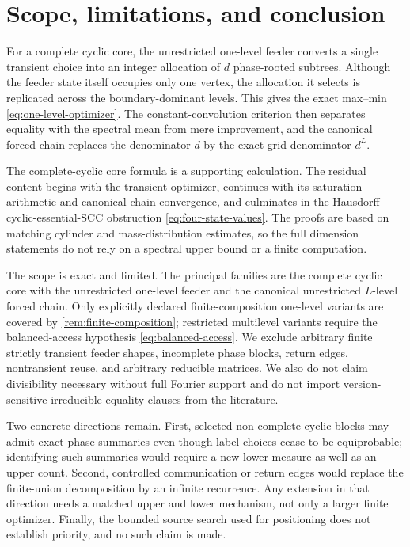 \section{Scope, limitations, and conclusion}
\label{sec:conclusion}

For a complete cyclic core, the unrestricted one-level feeder converts a
single transient choice into an integer allocation of $d$ phase-rooted
subtrees.  Although the feeder state itself occupies only one vertex, the
allocation it selects is replicated across the boundary-dominant levels.
This gives the exact max--min \eqref{eq:one-level-optimizer}.  The
constant-convolution criterion then separates equality with the spectral
mean from mere improvement, and the canonical forced chain replaces the
denominator $d$ by the exact grid denominator $d^L$.

The complete-cyclic core formula is a supporting calculation.  The residual
content begins with the transient optimizer, continues with its saturation
arithmetic and canonical-chain convergence, and culminates in the Hausdorff
cyclic-essential-SCC obstruction \eqref{eq:four-state-values}.  The proofs are based on
matching cylinder and mass-distribution estimates, so the full dimension
statements do not rely on a spectral upper bound or a finite computation.

The scope is exact and limited.  The principal families are the complete
cyclic core with the unrestricted one-level feeder and the canonical
unrestricted $L$-level forced chain.  Only explicitly declared
finite-composition one-level variants are covered by
\cref{rem:finite-composition}; restricted multilevel variants require the
balanced-access hypothesis \eqref{eq:balanced-access}.  We exclude arbitrary
finite strictly transient feeder shapes, incomplete phase blocks, return
edges, nontransient reuse, and arbitrary reducible matrices.  We also do not
claim divisibility necessary without full Fourier support and do not import
version-sensitive irreducible equality clauses from the literature.

Two concrete directions remain.  First, selected non-complete cyclic blocks
may admit exact phase summaries even though label choices cease to be
equiprobable; identifying such summaries would require a new lower measure as
well as an upper count.  Second, controlled communication or return edges
would replace the finite-union decomposition by an infinite recurrence.
Any extension in that direction needs a matched upper and lower mechanism,
not only a larger finite optimizer.  Finally, the bounded source search used
for positioning does not establish priority, and no such claim is made.
